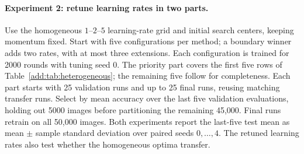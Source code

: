 \paragraph{Experiment 2: retune learning rates in two parts.}
Use the homogeneous $1$--$2$--$5$ learning-rate grid and initial search centers,
keeping momentum fixed. Start with five configurations per method; a boundary
winner adds two rates, with at most three extensions. Each configuration is
trained for 2000 rounds with tuning seed 0. The priority part covers the
first five rows of Table~\ref{add:tab:heterogeneous}; the remaining five
follow for completeness. Each part starts with 25 validation runs and up to 25
final runs, reusing matching transfer runs. Select by mean accuracy over
the last five validation evaluations, holding out 5000 images before
partitioning the remaining 45,000. Final runs retrain on all 50,000 images.
Both experiments report the last-five test mean as mean $\pm$ sample
standard deviation over paired seeds $0,\ldots,4$. The retuned learning
rates also test whether the homogeneous optima transfer.

